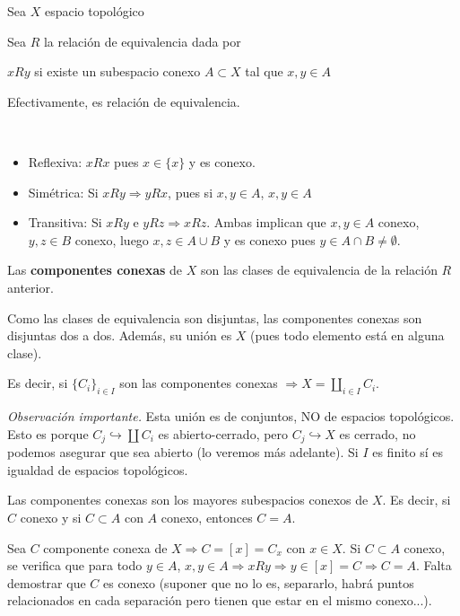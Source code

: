Sea $X$ espacio topol\'ogico
\begin{defi}
    Sea $R$ la relaci\'on de equivalencia dada por 
    \begin{center}
        $xRy$ si existe un subespacio conexo $A\subset X$ tal que $x,y\in A$ 
    \end{center}
\end{defi}
\begin{prop}
    Efectivamente, es relaci\'on de equivalencia.
\end{prop}
\begin{dem} \,
    \begin{itemize}
        \item Reflexiva: $xRx$ pues $x\in \{x\}$ y es conexo.
        \item Sim\'etrica: Si $xRy \Rightarrow yRx$, pues si $x,y\in A$, $x, y\in A$
        \item Transitiva: Si $xRy$ e $yRz \Rightarrow xRz$. Ambas implican que $x,y \in A$ conexo, $y,z \in B$ conexo, luego $x,z\in A\cup B$ y es conexo pues $y\in A\cap B \neq \emptyset$. 
    \end{itemize}
\end{dem}
\begin{defi}
    Las \textbf{componentes conexas} de $X$ son las clases de equivalencia de la relaci\'on $R$ anterior. 
\end{defi}
\begin{obs}
    Como las clases de equivalencia son disjuntas, las componentes conexas son disjuntas dos a dos. Adem\'as, su uni\'on es $X$ (pues todo elemento est\'a en alguna clase).
    
    Es decir, si $\{C_i\}_{i \in I}$ son las componentes conexas $\Rightarrow X = \coprod_{i \in I} C_i$. 
    
   \noindent \textit{Observaci\'on importante.} Esta uni\'on es de conjuntos, NO de espacios topol\'ogicos. Esto es porque $C_j \hookrightarrow \coprod C_i$ es abierto-cerrado, pero $C_j \hookrightarrow X$ es cerrado, no podemos asegurar que sea abierto (lo veremos m\'as adelante). Si $I$ es finito s\'i es igualdad de espacios topol\'ogicos.
\end{obs}
\begin{prop}
Las componentes conexas son los mayores subespacios conexos de $X$. Es decir, si $C$ conexo y si $C \subset A$ con $A$ conexo, entonces $C=A$.
\end{prop}
\begin{dem}
    Sea $C$ componente conexa de $X\Rightarrow C=[x]=C_x$ con $x\in X$. Si $C \subset A$ conexo, se verifica que para todo $y\in A$, $x,y\in A \Rightarrow xRy \Rightarrow y\in [x] = C \Rightarrow C=A$. Falta demostrar que $C$ es conexo (suponer que no lo es, separarlo, habr\'a puntos relacionados en cada separaci\'on pero tienen que estar en el mismo conexo...). 
\end{dem}
